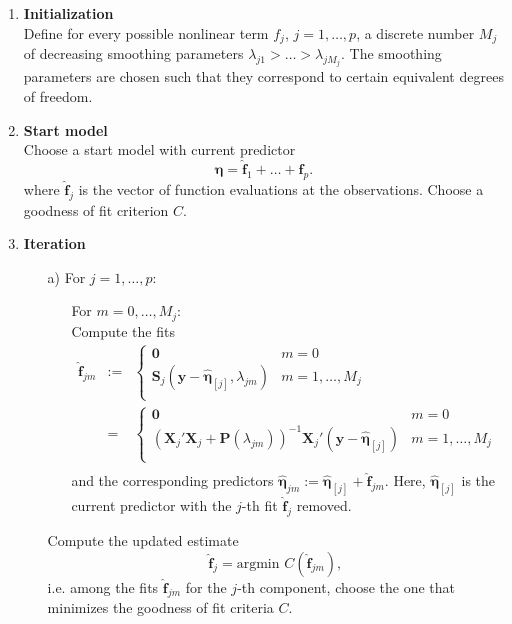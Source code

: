 \documentclass[11pt,a4paper,twoside]{bayesxarticle}
\def \Pvec {\vec{P}}
\def \etavec {\boldsymbol{\eta}}
\def \fhatvec {\mathbf{\hat{f}}}
\def \yvec {\mathbf{y}}
\def \Pvec {\mathbf{P}}
\def \Xvec {\mathbf{X}}
\def \nullvec {\boldsymbol{0}}
\def \Smat {\mathbf{S}}
\begin{document}
\begin{enumerate}
\item {\bf Initialization} \\
Define for every possible nonlinear term $f_j$, $j=1,\dots,p$, a
discrete number $M_j$ of decreasing smoothing parameters
$\lambda_{j1} > \ldots >\lambda_{jM_j}$. The smoothing parameters
are chosen such that they correspond to certain equivalent degrees
of freedom.
\item {\bf Start model} \\
Choose a start model with current predictor
$$
\hat{\etavec} = \fhatvec_1 + \ldots + \fhatvec_p.
$$
where $\fhatvec_j$ is the vector of function evaluations at the
observations. Choose a goodness of fit criterion $C$.

\item {\bf Iteration}
\begin{itemize}
\item[a)] For $j=1,\dots,p$:
\begin{enumerate}
\item[]
For $m=0,\dots,M_j$: \\
Compute the fits
$$
\begin{array}{lll}
\fhatvec_{jm} & := &
\left\{
\begin{array}{ll}
\nullvec & m=0 \\
\Smat_j(\yvec-\hat{\etavec}_{[j]},\lambda_{jm})  & m=1,\dots,M_j \\
\end{array}
\right. \\[0.4cm]
& = &
\left\{
\begin{array}{ll}
\nullvec & m=0 \\
(\Xvec_j'\Xvec_j + \Pvec(\lambda_{jm}))^{-1} \Xvec_j' (\yvec-\hat{\etavec}_{[j]})  & m=1,\dots,M_j \\
\end{array}
\right. \\
\end{array}
$$
and the corresponding predictors $\hat{\etavec}_{jm} :=
\hat{\etavec}_{[j]}+\fhatvec_{jm}$. Here,  $\hat{\etavec}_{[j]}$ is
the current predictor with the $j$-th fit  $\fhatvec_j$  removed.
\end{enumerate}

Compute the updated estimate
$$
\fhatvec_j = \mbox{argmin} \, \,  C(\fhatvec_{jm}),
$$
i.e. among the fits $\fhatvec_{jm}$ for the $j$-th component, choose the one that minimizes
the goodness of fit criteria $C$.


\end{itemize}
\end{enumerate}
\end{document}
